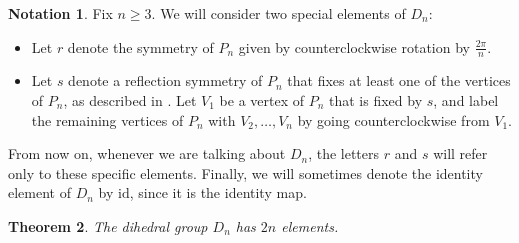 \documentclass[12pt]{report}
\newtheorem{theorem}{Theorem}[chapter]
\numberwithin{equation}{section}
\numberwithin{theorem}{chapter}
\theoremstyle{definition}
\newtheorem*{basic properties}{Basic Properties}
\newtheorem*{Important Remark}{Important Remark}
\newtheorem{notation}[theorem]{Notation}
\begin{document}
\begin{notation}\label{defining r and s}
	Fix $n \geqslant 3$. We will consider two special elements of $D_n$: 
\begin{itemize}
	\item Let $r$ denote the symmetry of $P_n$ given by counterclockwise rotation by $\frac{2 \pi}{n}$.
	\item Let $s$ denote a reflection symmetry of $P_n$ that fixes at least one of the vertices of $P_n$, as described in . Let $V_1$ be a vertex of $P_n$ that is fixed by $s$, and label the remaining vertices of $P_n$ with $V_2, \ldots, V_{n}$ by going counterclockwise from $V_1$.
\end{itemize}

From now on, whenever we are talking about $D_n$, the letters $r$ and $s$ will refer only to these specific elements. Finally, we will sometimes denote the identity element of $D_n$ by $\mathrm{id}$, since it is the identity map.
\end{notation}






\begin{theorem}\label{D_n has n elements}
	The dihedral group $D_n$ has $2n$ elements.
\end{theorem}
\end{document}
